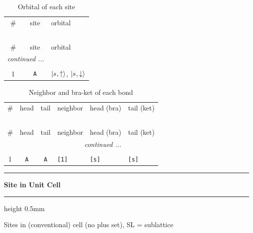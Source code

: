 \documentclass[fleqn,10pt,landscape]{jsarticle}
\begin{document}
\renewcommand{\arraystretch}{1.6}
\begin{longtable}[l]{ccl}
\captionsetup{justification=raggedright, singlelinecheck=off}
\caption{Orbital of each site}
 \\
 \hline \hline
\# & site & orbital \\ \hline \endfirsthead

\multicolumn{2}{l}{\tablename\ \thetable{}} \\
 \hline \hline
\# & site & orbital \\ \hline \endhead

 \hline \hline
\multicolumn{2}{r}{\footnotesize\it continued ...} \\ \endfoot

 \hline \hline
\multicolumn{2}{r}{} \\ \endlastfoot

1 & \texttt{A} & $\ket{s_{},\uparrow}$, $\ket{s_{},\downarrow}$ \\
\end{longtable}
\renewcommand{\arraystretch}{1.6}
\begin{longtable}[l]{ccclll}
\captionsetup{justification=raggedright, singlelinecheck=off}
\caption{Neighbor and bra-ket of each bond}
 \\
 \hline \hline
\# & head & tail & neighbor & head (bra) & tail (ket) \\ \hline \endfirsthead

\multicolumn{5}{l}{\tablename\ \thetable{}} \\
 \hline \hline
\# & head & tail & neighbor & head (bra) & tail (ket) \\ \hline \endhead

 \hline \hline
\multicolumn{5}{r}{\footnotesize\it continued ...} \\ \endfoot

 \hline \hline
\multicolumn{5}{r}{} \\ \endlastfoot

1 & \texttt{A} & \texttt{A} & \texttt{[1]} & \texttt{[s]} & \texttt{[s]} \\
\end{longtable}
\vspace{5mm}
\noindent \rule[0.5mm]{5mm}{0.5mm}\hspace{3mm}\textbf{Site in Unit Cell}\hspace{3mm}\leaders\hrule height 0.5mm\hfill\kern0pt
\vspace{3mm}

\noindent Sites in (conventional) cell (no plus set), SL = sublattice
\end{document}
